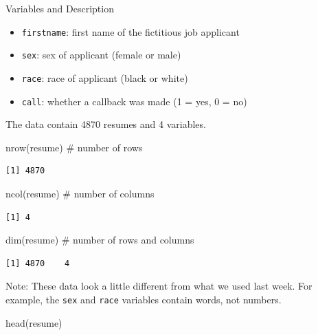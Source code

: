 \documentclass[
  letterpaper,
  DIV=11,
  numbers=noendperiod]{scrreprt}
\newenvironment{Shaded}{\begin{snugshade}}{\end{snugshade}}
\newcommand{\CommentTok}[1]{\textcolor[rgb]{0.37,0.37,0.37}{#1}}
\newcommand{\FunctionTok}[1]{\textcolor[rgb]{0.28,0.35,0.67}{#1}}
\newcommand{\NormalTok}[1]{\textcolor[rgb]{0.00,0.23,0.31}{#1}}
\providecommand{\tightlist}{%
  \setlength{\itemsep}{0pt}\setlength{\parskip}{0pt}}\usepackage{longtable,booktabs,array}
\begin{document}
Variables and Description

\begin{itemize}
\tightlist
\item
  \texttt{firstname}: first name of the fictitious job applicant
\item
  \texttt{sex}: sex of applicant (female or male)
\item
  \texttt{race}: race of applicant (black or white)
\item
  \texttt{call}: whether a callback was made (1 = yes, 0 = no)
\end{itemize}

The data contain 4870 resumes and 4 variables.

\begin{Shaded}
\begin{Highlighting}[]
\FunctionTok{nrow}\NormalTok{(resume) }\CommentTok{\# number of rows}
\end{Highlighting}
\end{Shaded}

\begin{verbatim}
[1] 4870
\end{verbatim}

\begin{Shaded}
\begin{Highlighting}[]
\FunctionTok{ncol}\NormalTok{(resume) }\CommentTok{\# number of columns}
\end{Highlighting}
\end{Shaded}

\begin{verbatim}
[1] 4
\end{verbatim}

\begin{Shaded}
\begin{Highlighting}[]
\FunctionTok{dim}\NormalTok{(resume) }\CommentTok{\# number of rows and columns}
\end{Highlighting}
\end{Shaded}

\begin{verbatim}
[1] 4870    4
\end{verbatim}

Note: These data look a little different from what we used last week.
For example, the \texttt{sex} and \texttt{race} variables contain words,
not numbers.

\begin{Shaded}
\begin{Highlighting}[]
\FunctionTok{head}\NormalTok{(resume)}
\end{Highlighting}
\end{Shaded}
\end{document}

